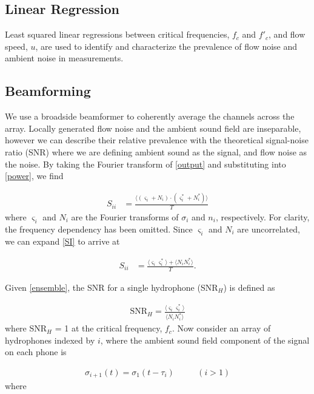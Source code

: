 \documentclass[12pt,journal,onecolumn]{IEEEtran}
\begin{document}
\subsection{Linear Regression}

Least squared linear regressions between critical frequencies,  $f_c$ and $f'_c$, and flow speed, $u$, are used to identify and characterize the prevalence of flow noise and ambient noise in measurements. 



\subsection{Beamforming }

We use a broadside beamformer to coherently average the channels across the array. Locally generated flow noise and the ambient sound field are inseparable, however we can describe their relative prevalence with the theoretical signal-noise ratio (SNR) where we are defining ambient sound as the signal, and flow noise as the noise. By taking the Fourier transform of \eqref{output} and substituting into \eqref{power}, we find

\begin{align}
S_{ii} &= \frac{\langle (\varsigma_i + N_i)\cdot(\varsigma^*_i + N^*_i) \rangle}{T}
\label{SI}
\end{align}
where $\varsigma_i$ and $N_i$ are the Fourier transforms of $\sigma_i$ and $n_i$, respectively. For clarity, the frequency dependency has been omitted. Since $\varsigma_i$ and $N_i$ are uncorrelated, we can expand \eqref{SI} to arrive at

\begin{align}
S_{ii} &= \frac{\langle \varsigma_i \varsigma^*_i \rangle + \langle N_i N^*_i \rangle}{T}.
\label{ensemble}
\end{align}

Given \eqref{ensemble}, the SNR for a single hydrophone (SNR$_H$) is defined as	

\begin{align}
\text{SNR}_H = \frac{\langle \varsigma_i \varsigma^*_i \rangle}{\langle N_i N^*_i \rangle}
\label{SNR}
\end{align}
where SNR$_H$ = 1 at the critical frequency, $f_c$. Now consider an array of hydrophones indexed by $i$, where the ambient sound field component of the signal on each phone is

\begin{align}
\sigma_{i+1}(t) = \sigma_1(t-\tau_{i}) \quad \quad \text{ } (i>1)
\label{delay}
\end{align}
where 
\end{document}
